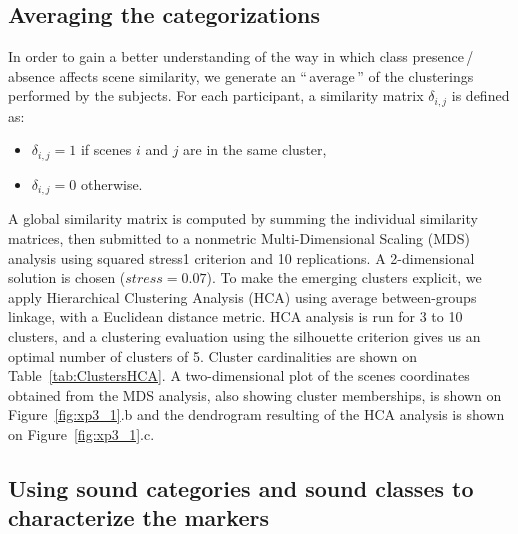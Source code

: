 \documentclass[twoside,twocolumn]{article}
\begin{document}

\subsection{Averaging the categorizations}

In order to gain a better understanding of the way in which class presence\,/ absence affects scene similarity, we generate an ``\,average\,'' of the clusterings performed by the subjects. For each participant, a similarity matrix $\delta_{i,j}$ is defined as: \\

\begin{itemize}
\item $\delta_{i,j}=1$ if scenes $i$ and $j$ are in the same cluster, \\
\item $\delta_{i,j}=0$ otherwise.\\
\end{itemize}

A global similarity matrix is computed by summing the individual similarity matrices, then submitted to a nonmetric  Multi-Dimensional Scaling (MDS) analysis using squared stress1 criterion and 10 replications. A 2-dimensional solution is chosen ($stress=0.07$). To make the emerging clusters explicit, we apply Hierarchical Clustering Analysis (HCA) using average between-groups linkage, with a Euclidean distance metric. HCA analysis is run for 3 to 10 clusters, and a clustering evaluation using the silhouette criterion gives us an optimal number of clusters of 5. Cluster cardinalities are shown on Table~\ref{tab:ClustersHCA}. A two-dimensional plot of the scenes coordinates obtained from the MDS analysis, also showing cluster memberships, is shown on Figure~\ref{fig:xp3_1}.b and the dendrogram resulting of the HCA analysis is shown on Figure~\ref{fig:xp3_1}.c. 

\subsection{Using sound categories and sound classes to characterize the markers}
\end{document}
